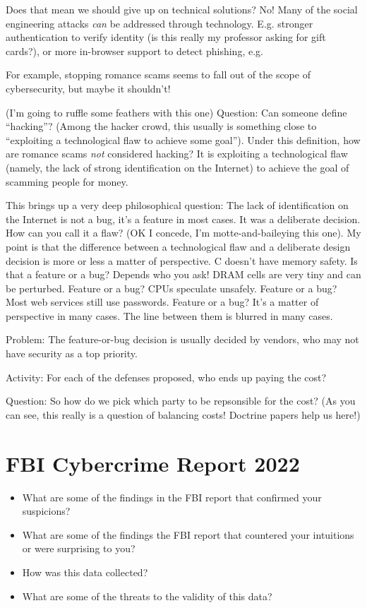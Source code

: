 \documentclass[11pt]{article}
\begin{document}
Does that mean we should give up on technical solutions? No! Many of the social engineering attacks {\it can} be addressed through technology. E.g. stronger authentication to verify identity (is this really my professor asking for gift cards?), or more in-browser support to detect phishing, e.g.

For example, stopping romance scams seems to fall out of the scope of cybersecurity, but maybe it shouldn't! 

(I'm going to ruffle some feathers with this one) Question: Can someone define ``hacking''? (Among the hacker crowd, this usually is something close to ``exploiting a technological flaw to achieve some goal''). Under this definition, how are romance scams {\it not} considered hacking? It is exploiting a technological flaw (namely, the lack of strong identification on the Internet) to achieve the goal of scamming people for money. 

This brings up a very deep philosophical question: The lack of identification on the Internet is not a bug, it's a feature in most cases. It was a deliberate decision. How can you call it a flaw? (OK I concede, I'm motte-and-baileying this one). My point is that the difference between a technological flaw and a deliberate design decision is more or less a matter of perspective. C doesn't have memory safety. Is that a feature or a bug? Depends who you ask! DRAM cells are very tiny and can be perturbed. Feature or a bug? CPUs speculate unsafely. Feature or a bug? Most web services still use passwords. Feature or a bug? It's a matter of perspective in many cases. The line between them is blurred in many cases.

Problem: The feature-or-bug decision is usually decided by vendors, who may not have security as a top priority. 

Activity: For each of the defenses proposed, who ends up paying the cost?

Question: So how do we pick which party to be repsonsible for the cost? (As you can see, this really is a question of balancing costs! Doctrine papers help us here!)



\section*{FBI Cybercrime Report 2022}

\begin{itemize}
    \item What are some of the findings in the FBI report that confirmed your suspicions?
    \item What are some of the findings the FBI report that countered your intuitions or were surprising to you? 
    \item How was this data collected?
    \item What are some of the threats to the validity of this data?
\end{itemize}
\end{document}

